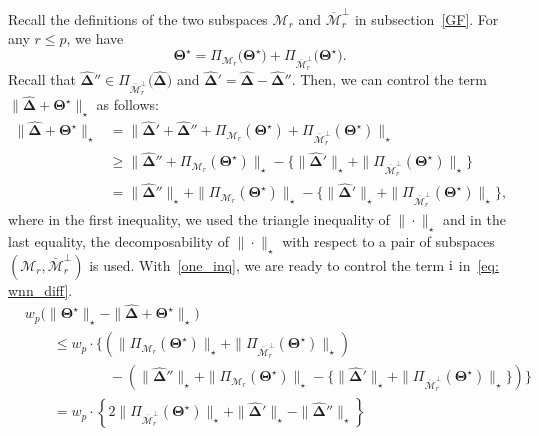 \documentclass[alpha-refs]{wiley-article}
\newcommand{\RN}[1]{ \textup{\uppercase\expandafter{\romannumeral#1}} }
\begin{document}
\noindent
Recall the definitions of the two subspaces $\mathcal{M}_{r}$ and $\overline{\mathcal{M}}_{r}^{\perp}$ in subsection~\ref{GF}.
For any $r\leq p$, we have
\begin{equation} \label{star}
    \boldsymbol{\Theta^{\star}} = \Pi_{\mathcal{M}_{r}}\big(\boldsymbol{\Theta^{\star}}\big) +  \Pi_{\overline{\mathcal{M}}_{r}^{\perp}}\big(\boldsymbol{\Theta^{\star}}\big).
\end{equation}
Recall that $\boldsymbol{\widehat{\Delta}}'' \in \Pi_{\overline{\mathcal{M}}_{r}^{\perp}}\big(\boldsymbol{\widehat{\Delta}}\big)$ and
$\boldsymbol{\widehat{\Delta}}'=\boldsymbol{\widehat{\Delta}}-\boldsymbol{\widehat{\Delta}}''$.
Then, we can control the term $\|\boldsymbol{\widehat{\Delta}} + \boldsymbol{\Theta^{\star}}\|_{\star}$ as follows:
\begin{align}
    \|\boldsymbol{\widehat{\Delta}} + \boldsymbol{\Theta^{\star}}\|_{\star} & =  \|\boldsymbol{\widehat{\Delta}}' + \boldsymbol{\widehat{\Delta}}'' + \Pi_{\mathcal{M}_{r}}(\boldsymbol{\Theta^{\star}}) + \Pi_{\overline{\mathcal{M}}_{r}^{\perp}}(\boldsymbol{\Theta^{\star}})\|_{\star}\nonumber \\
    & \geq  \|\boldsymbol{\widehat{\Delta}}'' + \Pi_{\mathcal{M}_{r}}(\boldsymbol{\Theta^{\star}})\|_{\star} - \{\|\boldsymbol{\widehat{\Delta}}'\|_{\star} + \|\Pi_{\overline{\mathcal{M}}_{r}^{\perp}}(\boldsymbol{\Theta^{\star}})\|_{\star}\} \nonumber\\
    & =  \|\boldsymbol{\widehat{\Delta}}''\|_{\star} + \|\Pi_{\mathcal{M}_{r}}(\boldsymbol{\Theta^{\star}})\|_{\star} - \{\|\boldsymbol{\widehat{\Delta}}'\|_{\star} + \|\Pi_{\overline{\mathcal{M}}_{r}^{\perp}}(\boldsymbol{\Theta^{\star}})\|_{\star}\} \label{one_inq},
\end{align}
where in the first inequality, we used the triangle inequality of $\|\cdot\|_{\star}$ and in the last equality, the decomposability of $\|\cdot\|_{\star}$ with respect to a pair of subspaces $(\mathcal{M}_{r},\overline{\mathcal{M}}_{r}^{\perp})$ is used.
With~\eqref{one_inq}, we are ready to control the term $\RN{1}$ in~\eqref{eq: wnn_diff}.
\begin{align}
    & w_{p}\Bigg( \|\boldsymbol{\Theta^{\star}}\|_{\star} - \|\boldsymbol{\widehat{\Delta}} + \boldsymbol{\Theta^{\star}}\|_{\star} \Bigg)
    \nonumber \\
    & \qquad \leq  w_{p} \cdot \Bigg\{ \left( \|\Pi_{\mathcal{M}_{r}}(\boldsymbol{\Theta^{\star}})\|_{\star} + \|\Pi_{\overline{\mathcal{M}}_{r}^{\perp}}(\boldsymbol{\Theta^{\star}})\|_{\star} \right) \nonumber \\
    & \qquad \qquad \qquad - \left(\|\boldsymbol{\widehat{\Delta}}''\|_{\star} + \|\Pi_{\mathcal{M}_{r}}(\boldsymbol{\Theta^{\star}})\|_{\star} - \{\|\boldsymbol{\widehat{\Delta}}'\|_{\star} + \|\Pi_{\overline{\mathcal{M}}_{r}^{\perp}}(\boldsymbol{\Theta^{\star}})\|_{\star}\} \right) \Bigg\} \nonumber \\
    & \qquad =  w_{p} \cdot \left\lbrace 2\|\Pi_{\overline{\mathcal{M}}_{r}^{\perp}}(\boldsymbol{\Theta^{\star}})\|_{\star} + \|\boldsymbol{\widehat{\Delta}}'\|_{\star} - \|\boldsymbol{\widehat{\Delta}}''\|_{\star} \right\rbrace \label{eq: wnn_diff_1}
\end{align}
\end{document}
